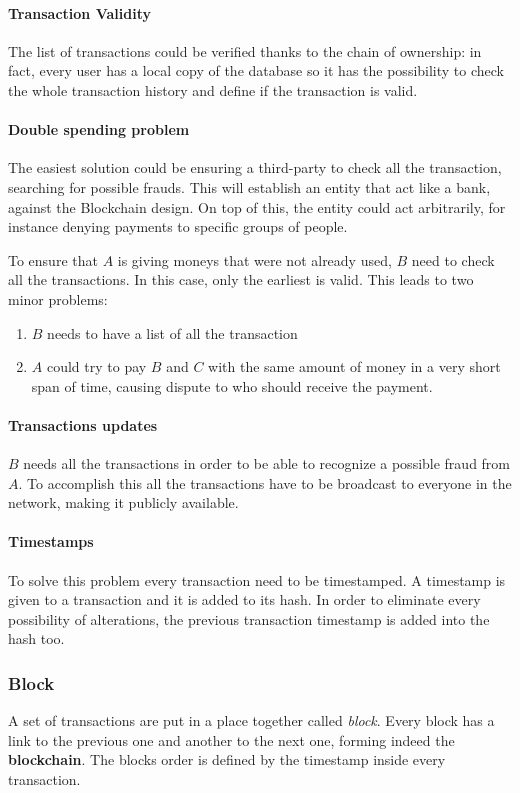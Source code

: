 \paragraph*{Transaction Validity}
The list of transactions could be verified thanks to the chain of ownership:
in fact, every user has a local copy of the database so it has the possibility
to check the whole transaction history and define if the transaction is valid.

\paragraph*{Double spending problem}
The easiest solution could be ensuring a third-party to check all the
transaction, searching for possible frauds. This will establish an entity
that act like a bank, against the Blockchain design. On top of this,
the entity could act arbitrarily, for instance denying payments to specific
groups of people.

To ensure that $A$ is giving moneys that were not already used, $B$ need to
check all the transactions. In this case, only the earliest is
valid\cite{nakamoto08}. This leads to two minor problems:
\begin{enumerate}
 \item $B$ needs to have a list of all the transaction
 \item $A$ could try to pay $B$ and $C$ with the same amount of money in a very
short span of time, causing dispute to who should receive the payment.
\end{enumerate}

\paragraph*{Transactions updates}
\label{TU}
$B$ needs all the transactions in order to be able to recognize a possible
fraud from $A$. To accomplish this all the transactions have to be broadcast to
everyone in the network, making it publicly available.

\paragraph*{Timestamps}
To solve this problem every transaction need to be timestamped. A timestamp is
given to a transaction and it is added to its hash. In order to eliminate every
possibility of alterations, the previous transaction timestamp is added into
the hash too.

\subsubsection{Block}
A set of transactions are put in a place together called \textit{block}. Every
block has a link to the previous one and another to the next one, forming
indeed the \textbf{blockchain}.
The blocks order is defined by the timestamp inside every transaction.

